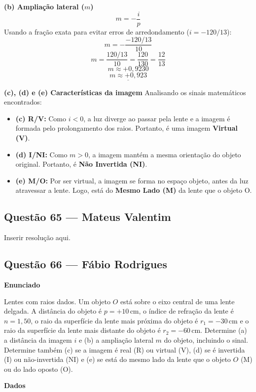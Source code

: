 \documentclass[12pt,a4paper]{article}
\begin{document}
\vspace{0.2cm}
\textbf{(b) Ampliação lateral (\(m\))}
\[m = -\frac{i}{p}\]
Usando a fração exata para evitar erros de arredondamento (\(i = -120/13\)):
\[m = -\frac{-120/13}{10}\]
\[m = \frac{120/13}{10} = \frac{120}{130} = \frac{12}{13}\]
\[m \approx +0,9230\]
\[\underline{m \approx +0,923}\]

\vspace{0.2cm}
\textbf{(c), (d) e (e) Características da imagem}
Analisando os sinais matemáticos encontrados:
\begin{itemize}
    \item \textbf{(c) R/V:} Como \(i < 0\), a luz diverge ao passar pela lente e a imagem é formada pelo prolongamento dos raios. Portanto, é uma imagem \textbf{Virtual (V)}.
    \item \textbf{(d) I/NI:} Como \(m > 0\), a imagem mantém a mesma orientação do objeto original. Portanto, é \textbf{Não Invertida (NI)}.
    \item \textbf{(e) M/O:} Por ser virtual, a imagem se forma no espaço objeto, antes da luz atravessar a lente. Logo, está do \textbf{Mesmo Lado (M)} da lente que o objeto O.
\end{itemize}

\subsection{Questão 65 — Mateus Valentim}
Inserir resolução aqui.

\subsection{Questão 66 — Fábio Rodrigues}
\textbf{Enunciado}

Lentes com raios dados. Um objeto \(O\) está sobre o eixo central de uma lente delgada. A distância do objeto é \(p = +10\,\text{cm}\), o índice de refração da lente é \(n = 1,50\), o raio da superfície da lente mais próxima do objeto é \(r_1 = -30\,\text{cm}\) e o raio da superfície da lente mais distante do objeto é \(r_2 = -60\,\text{cm}\). Determine (a) a distância da imagem \(i\) e (b) a ampliação lateral \(m\) do objeto, incluindo o sinal. Determine também (c) se a imagem é real (R) ou virtual (V), (d) se é invertida (I) ou não-invertida (NI) e (e) se está do mesmo lado da lente que o objeto \(O\) (M) ou do lado oposto (O).

\vspace{0.5cm}

\textbf{Dados}
\end{document}
